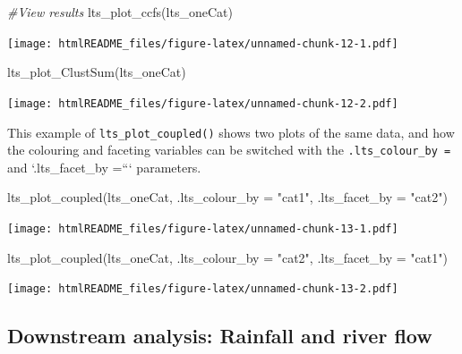 \documentclass[
]{article}
\newenvironment{Shaded}{\begin{snugshade}}{\end{snugshade}}
\newcommand{\AttributeTok}[1]{\textcolor[rgb]{0.77,0.63,0.00}{#1}}
\newcommand{\CommentTok}[1]{\textcolor[rgb]{0.56,0.35,0.01}{\textit{#1}}}
\newcommand{\FunctionTok}[1]{\textcolor[rgb]{0.00,0.00,0.00}{#1}}
\newcommand{\NormalTok}[1]{#1}
\newcommand{\StringTok}[1]{\textcolor[rgb]{0.31,0.60,0.02}{#1}}
\begin{document}
\begin{Shaded}
\begin{Highlighting}[]
\CommentTok{\#View results}
\FunctionTok{lts\_plot\_ccfs}\NormalTok{(lts\_oneCat)}
\end{Highlighting}
\end{Shaded}

\texttt{[image: htmlREADME\_files/figure-latex/unnamed-chunk-12-1.pdf]}

\begin{Shaded}
\begin{Highlighting}[]
\FunctionTok{lts\_plot\_ClustSum}\NormalTok{(lts\_oneCat)}
\end{Highlighting}
\end{Shaded}

\texttt{[image: htmlREADME\_files/figure-latex/unnamed-chunk-12-2.pdf]}

This example of \texttt{lts\_plot\_coupled()} shows two plots of the
same data, and how the colouring and faceting variables can be switched
with the \texttt{.lts\_colour\_by\ =} and `.lts\_facet\_by =```
parameters.

\begin{Shaded}
\begin{Highlighting}[]
\FunctionTok{lts\_plot\_coupled}\NormalTok{(lts\_oneCat, }
                 \AttributeTok{.lts\_colour\_by =} \StringTok{"cat1"}\NormalTok{, }
                 \AttributeTok{.lts\_facet\_by =} \StringTok{"cat2"}\NormalTok{)}
\end{Highlighting}
\end{Shaded}

\texttt{[image: htmlREADME\_files/figure-latex/unnamed-chunk-13-1.pdf]}

\begin{Shaded}
\begin{Highlighting}[]
\FunctionTok{lts\_plot\_coupled}\NormalTok{(lts\_oneCat, }
                 \AttributeTok{.lts\_colour\_by =} \StringTok{"cat2"}\NormalTok{, }
                 \AttributeTok{.lts\_facet\_by =} \StringTok{"cat1"}\NormalTok{)}
\end{Highlighting}
\end{Shaded}

\texttt{[image: htmlREADME\_files/figure-latex/unnamed-chunk-13-2.pdf]}

\hypertarget{downstream-analysis-rainfall-and-river-flow}{%
\subsection{\texorpdfstring{\textbf{Downstream analysis: Rainfall and
river
flow}}{Downstream analysis: Rainfall and river flow}}\label{downstream-analysis-rainfall-and-river-flow}}
\end{document}
